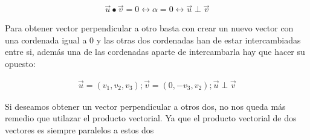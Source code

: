 \documentclass[
	12pt, %
	spanish, %
]{fphw}
\newcommand{\vu}{\vec{u}}
\newcommand{\vv}{\vec{v}}
\begin{document}
\begin{gather*}
	\vu \bullet \vv = 0 \leftrightarrow \alpha = 0 \leftrightarrow  \vu \perp \vv
\end{gather*}

Para obtener vector perpendicular a otro basta con crear un nuevo vector con una cordenada igual a 0 y las otras dos cordenadas han de estar intercambiadas entre si, además una de las cordenadas aparte de intercambarla hay que hacer su opuesto:

\begin{gather*}
	\vu=(v_1,v_2,v_3); \vv=(0, -v_3,v_2); \vu \perp \vv
\end{gather*}

Si deseamos obtener un vector perpendicular a otros dos, no nos queda más remedio que utilazar el producto vectorial. Ya que el producto vectorial de dos vectores es siempre paralelos a estos dos
\end{document}
